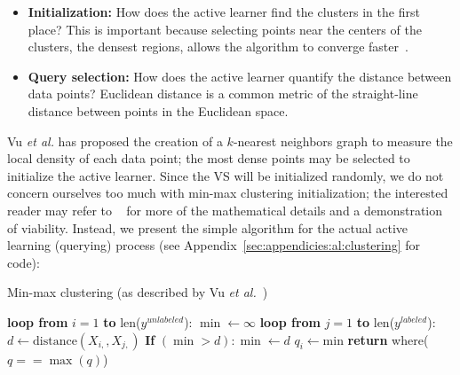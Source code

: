\tablespacing
\begin{itemize}
	\item \textbf{Initialization:} How does the active learner find the 
	clusters in the first place? This is important because selecting points 
	near the centers of the clusters, the densest regions, allows the algorithm 
	to converge faster~\cite{vu2010}.
	\item \textbf{Query selection:} How does the active learner quantify the 
	distance between data points? Euclidean distance is a common metric of the 
	straight-line distance between points in the Euclidean space.
\end{itemize}
\bodyspacing

Vu \textit{et al.} has proposed the creation of a $k$-nearest neighbors graph 
to measure the local density of each data point; the most dense points may be 
selected to initialize the active learner. Since the VS will be initialized 
randomly, we do not concern ourselves too much with min-max clustering 
initialization; the interested reader may refer to ~\cite{vu2010} for more of 
the mathematical details and a demonstration of viability. Instead, we present 
the simple algorithm for the actual active learning (querying) process (see 
Appendix~\ref{sec:appendicies:al:clustering} for code):

\tablespacing
\begin{algorithm}[H]
	\caption{Min-max clustering (as described by 
		Vu \textit{et al.}~\cite{vu2010})}\label{alg:al:methods:clustering}
	\begin{algorithmic}[1]
		\State \textbf{loop from} $i=1$ \textbf{to} len($y^{unlabeled}$):
		\State \indent $\min \gets \infty$
		\State \indent \textbf{loop from} $j=1$ \textbf{to} len($y^{labeled}$):
		\State \indent \indent  $d \gets \text{distance}(X_{i,},X_{j,})$
		\State \indent \indent \textbf{If} $(\min >d): \min \gets d$
		\State \indent $q_i \gets \text{min}$
		\State \textbf{return} where($q==\max{(q)}$)
		\EndProcedure
	\end{algorithmic}
\end{algorithm}
\bodyspacing